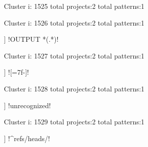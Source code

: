 Cluster i: 1525
total projects:2
total patterns:1
\begin{multicols}{1}
\end{multicols}







Cluster i: 1526
total projects:2
total patterns:1
\begin{multicols}{1}
\begin{description}[noitemsep,topsep=0pt]
\item [[2] ] \cverb!OUTPUT *(.*)!
\end{description}
\end{multicols}







Cluster i: 1527
total projects:2
total patterns:1
\begin{multicols}{1}
\begin{description}[noitemsep,topsep=0pt]
\item [[2] ] \cverb![=\x7f-\xff]!
\end{description}
\end{multicols}







Cluster i: 1528
total projects:2
total patterns:1
\begin{multicols}{1}
\begin{description}[noitemsep,topsep=0pt]
\item [[2] ] \cverb!unrecognized!
\end{description}
\end{multicols}







Cluster i: 1529
total projects:2
total patterns:1
\begin{multicols}{1}
\begin{description}[noitemsep,topsep=0pt]
\item [[2] ] \cverb!^refs/heads/!
\end{description}
\end{multicols}







